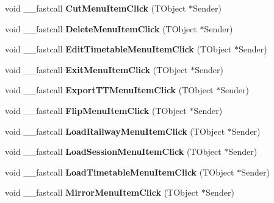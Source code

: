 \begin{DoxyCompactItemize}
void \+\_\+\+\_\+fastcall {\bfseries Cut\+Menu\+Item\+Click} (T\+Object $\ast$Sender)
\item 
\mbox{\label{class_t_interface_aff2c1cd6ed2d45fdcf6392a85a6d9415}} 
void \+\_\+\+\_\+fastcall {\bfseries Delete\+Menu\+Item\+Click} (T\+Object $\ast$Sender)
\item 
\mbox{\label{class_t_interface_a0cf35a6e4a6cfa72b63222acb51f9f74}} 
void \+\_\+\+\_\+fastcall {\bfseries Edit\+Timetable\+Menu\+Item\+Click} (T\+Object $\ast$Sender)
\item 
\mbox{\label{class_t_interface_a9cfdb7521877f2c7ab124d0e4f47a0f6}} 
void \+\_\+\+\_\+fastcall {\bfseries Exit\+Menu\+Item\+Click} (T\+Object $\ast$Sender)
\item 
\mbox{\label{class_t_interface_a1bf4807428bf9fa4504be97d28642597}} 
void \+\_\+\+\_\+fastcall {\bfseries Export\+T\+T\+Menu\+Item\+Click} (T\+Object $\ast$Sender)
\item 
\mbox{\label{class_t_interface_add5fbdbceae6285c2cc440905b270491}} 
void \+\_\+\+\_\+fastcall {\bfseries Flip\+Menu\+Item\+Click} (T\+Object $\ast$Sender)
\item 
\mbox{\label{class_t_interface_a96249c7622a9d55541de186483e04d2e}} 
void \+\_\+\+\_\+fastcall {\bfseries Load\+Railway\+Menu\+Item\+Click} (T\+Object $\ast$Sender)
\item 
\mbox{\label{class_t_interface_a5ade3b7719ed90dace590aa342fc0774}} 
void \+\_\+\+\_\+fastcall {\bfseries Load\+Session\+Menu\+Item\+Click} (T\+Object $\ast$Sender)
\item 
\mbox{\label{class_t_interface_a15a2f5ad77e4f6c2b0cc6314224dfb78}} 
void \+\_\+\+\_\+fastcall {\bfseries Load\+Timetable\+Menu\+Item\+Click} (T\+Object $\ast$Sender)
\item 
\mbox{\label{class_t_interface_a4ee6afffbc33eab918cba315ab65ee6e}} 
void \+\_\+\+\_\+fastcall {\bfseries Mirror\+Menu\+Item\+Click} (T\+Object $\ast$Sender)
\item 
\mbox{\label{class_t_interface_a56469c692fba7afba660312779f40ed3}} 

\end{DoxyCompactItemize}

